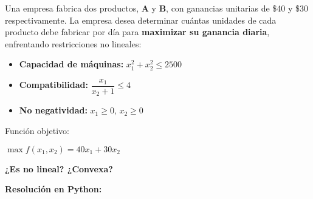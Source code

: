 \documentclass[12pt]{article}
\begin{document}
Una empresa fabrica dos productos, \textbf{A} y \textbf{B}, con ganancias unitarias de \$40 y \$30 respectivamente. La empresa desea determinar cuántas unidades de cada producto debe fabricar por día para \textbf{maximizar su ganancia diaria}, enfrentando restricciones no lineales:

\begin{itemize}
    \item \textbf{Capacidad de máquinas:} $x_1^2 + x_2^2 \leq 2500$
    \item \textbf{Compatibilidad:} $\dfrac{x_1}{x_2 + 1} \leq 4$
    \item \textbf{No negatividad:} $x_1 \geq 0$, $x_2 \geq 0$
\end{itemize}

Función objetivo:

\begin{center}
$\displaystyle \max f(x_1, x_2) = 40x_1 + 30x_2$
\end{center}

\textbf{¿Es no lineal? ¿Convexa?}

\vspace{1em}

\begin{center}
\end{center}

\vspace{1em}

\textbf{Resolución en Python:}
\end{document}
